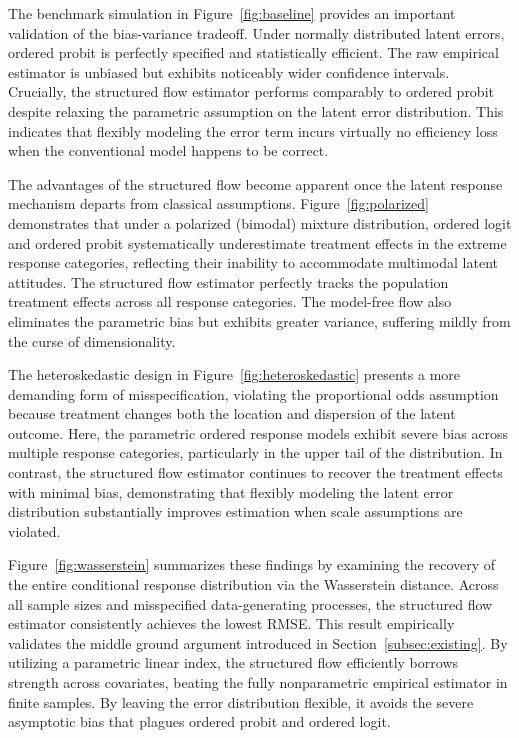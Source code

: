\documentclass{article}
\begin{document}
The benchmark simulation in Figure~\ref{fig:baseline} provides an important validation of the bias-variance tradeoff. Under normally distributed latent errors, ordered probit is perfectly specified and statistically efficient. The raw empirical estimator is unbiased but exhibits noticeably wider confidence intervals. Crucially, the structured flow estimator performs comparably to ordered probit despite relaxing the parametric assumption on the latent error distribution. This indicates that flexibly modeling the error term incurs virtually no efficiency loss when the conventional model happens to be correct.

The advantages of the structured flow become apparent once the latent response mechanism departs from classical assumptions. Figure~\ref{fig:polarized} demonstrates that under a polarized (bimodal) mixture distribution, ordered logit and ordered probit systematically underestimate treatment effects in the extreme response categories, reflecting their inability to accommodate multimodal latent attitudes. The structured flow estimator perfectly tracks the population treatment effects across all response categories. The model-free flow also eliminates the parametric bias but exhibits greater variance, suffering mildly from the curse of dimensionality.

The heteroskedastic design in Figure~\ref{fig:heteroskedastic} presents a more demanding form of misspecification, violating the proportional odds assumption because treatment changes both the location and dispersion of the latent outcome. Here, the parametric ordered response models exhibit severe bias across multiple response categories, particularly in the upper tail of the distribution. In contrast, the structured flow estimator continues to recover the treatment effects with minimal bias, demonstrating that flexibly modeling the latent error distribution substantially improves estimation when scale assumptions are violated.

Figure~\ref{fig:wasserstein} summarizes these findings by examining the recovery of the entire conditional response distribution via the Wasserstein distance. Across all sample sizes and misspecified data-generating processes, the structured flow estimator consistently achieves the lowest RMSE. This result empirically validates the middle ground argument introduced in Section~\ref{subsec:existing}. By utilizing a parametric linear index, the structured flow efficiently borrows strength across covariates, beating the fully nonparametric empirical estimator in finite samples. By leaving the error distribution flexible, it avoids the severe asymptotic bias that plagues ordered probit and ordered logit. 
\end{document}
